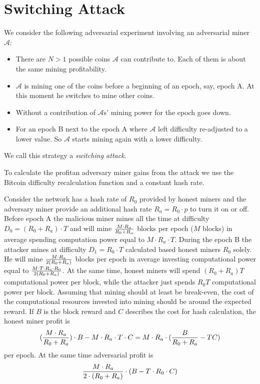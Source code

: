 \documentclass[number,preprint,review]{elsarticle}
\begin{document}
\section{Switching Attack}
\label{sec:attack}

We consider the following adversarial experiment involving an adversarial miner \(\mathcal{A}\):

\begin{itemize}
\item There are \(N > 1\) possible coins \(\mathcal{A}\) can contribute to. Each of them is about the same mining profitability.
\item \(\mathcal{A}\) is mining one of the coins before a beginning of an epoch, say, epoch A. At this moment he switches to mine other coins.
\item Without a contribution of \(\mathcal{A}\)s' mining power for the epoch goes down.
\item For an epoch B next to the epoch A where \(\mathcal{A}\) left difficulty re-adjusted to a lower value. So \(\mathcal{A}\) starts mining again with a lower difficulty.
\end{itemize}

We call this strategy a \textit{switching attack}.

To calculate the profitan adversary miner gains from the attack we use the Bitcoin difficulty recalculation function and a constant hash rate.

Consider the network has a hash rate of \(R_0\) provided by honest miners and the adversary miner provide an additional hash rate \(R_a=R_0\cdot p\) to turn it on or off.
Before epoch A the malicious miner mines all the time at difficulty \(D_0 = (R_0+R_a) \cdot T\) and will mine \(M\cdot R_a\over R_0+R_a\) blocks per epoch (\(M\) blocks) in average spending computation power equal to \(M \cdot R_a \cdot T\).
During the epoch B the attacker mines at difficulty \(D_1 = R_0 \cdot T\) calculated based honest miners \(R_0\) solely.
He will mine \(M\cdot R_a\over 2(R_0+R_a)\) blocks per epoch in average investing computational power equal to \(M\cdot T\cdot R_a\cdot R_0\over 2(R_0+R_a)\).
At the same time, honest miners will spend \((R_0+R_a)T\) computational power per block, while the attacker just spends \(R_0T\) computational power per block.
Assuming that mining should at least be break-even, the cost of the computational resources invested into mining should be around the expected reward.
If \(B\) is the block reward and \(C\) describes the cost for hash calculation, the honest miner profit is
\begin{equation}
{({M\cdot R_a\over R_0+R_a})\cdot B-M\cdot R_a\cdot T\cdot C=M\cdot R_a\cdot ({B\over R_0+R_a}-TC)}
\end{equation}
per epoch.
At the same time adversarial profit is
\begin{equation}
{{M\cdot R_a \over 2\cdot (R_0+R_a)}\cdot (B - T\cdot R_0\cdot C)}
\end{equation}
\end{document}
